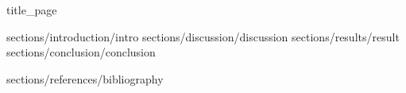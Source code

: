 \documentclass[oneside,openright,titlepage,numbers=noenddot,headinclude,
               footinclude=true,cleardoublepage=empty,
               BCOR=5mm,paper=a4,fontsize=11pt]{scrreprt}
\begin{document}
\frenchspacing
\raggedbottom
\pagestyle{empty}
\pagestyle{plain}


 {title_page}

 {sections/introduction/intro}
 {sections/discussion/discussion}
 {sections/results/result}
 {sections/conclusion/conclusion}



 {sections/references/bibliography}
\end{document}
